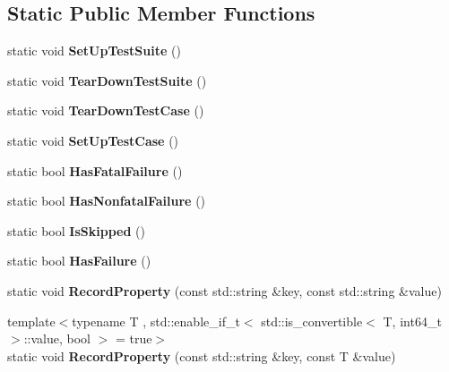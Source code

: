 \subsection*{Static Public Member Functions}
\begin{DoxyCompactItemize}
\item 
\mbox{\label{classtesting_1_1Test_ae173b07a0fdd09fc1d417a2bb6cbdd76}} 
static void {\bfseries Set\+Up\+Test\+Suite} ()
\item 
\mbox{\label{classtesting_1_1Test_a7704c8223ba28338a66ca2eaeba66383}} 
static void {\bfseries Tear\+Down\+Test\+Suite} ()
\item 
\mbox{\label{classtesting_1_1Test_af374706cbaf0ffc460f4fd04e7c150f1}} 
static void {\bfseries Tear\+Down\+Test\+Case} ()
\item 
\mbox{\label{classtesting_1_1Test_a5ccbac42fee8c5b00b0bfe89b6c49d79}} 
static void {\bfseries Set\+Up\+Test\+Case} ()
\item 
\mbox{\label{classtesting_1_1Test_a5e83604628ef542af888d631566ff60c}} 
static bool {\bfseries Has\+Fatal\+Failure} ()
\item 
\mbox{\label{classtesting_1_1Test_a8c00e8cc6fe10616b480bd54d2a426cb}} 
static bool {\bfseries Has\+Nonfatal\+Failure} ()
\item 
\mbox{\label{classtesting_1_1Test_a7f0ada5dbc9e772acb2b6cd0b1b300d7}} 
static bool {\bfseries Is\+Skipped} ()
\item 
\mbox{\label{classtesting_1_1Test_a7a00be7dd0a6bfdc8d47a1b784623613}} 
static bool {\bfseries Has\+Failure} ()
\item 
\mbox{\label{classtesting_1_1Test_a1559ce1c83f56993b582650c091535a7}} 
static void {\bfseries Record\+Property} (const std\+::string \&key, const std\+::string \&value)
\item 
\mbox{\label{classtesting_1_1Test_a24fea27f32ac2d9b023cb8e58bb6590a}} 
{\footnotesize template$<$typename T , std\+::enable\+\_\+if\+\_\+t$<$ std\+::is\+\_\+convertible$<$ T, int64\+\_\+t $>$\+::value, bool $>$  = true$>$ }\\static void {\bfseries Record\+Property} (const std\+::string \&key, const T \&value)
\end{DoxyCompactItemize}
